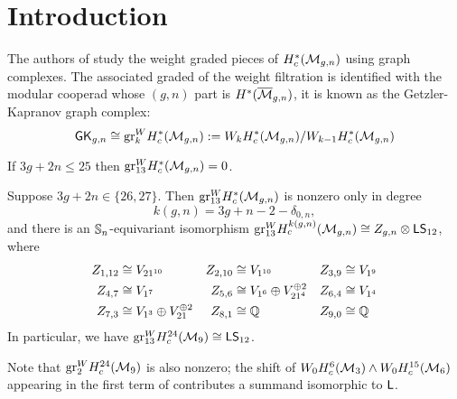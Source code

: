 



\section{Introduction}

The authors of \cite{CLPW2} study the weight graded pieces of $H^*_c(\M_{g,n})$ using graph complexes. The associated graded of the weight filtration is identified with the modular cooperad whose $(g,n)$ part is $H^*(\Mb_{g,n})$, it is known as the Getzler-Kapranov graph complex:
\begin{equation}
    \GK_{g,n} \cong  \gr^W_k H^*_c(\M_{g,n}) := W_k H^*_c(\M_{g,n})/W_{k-1}H^*_c(\M_{g,n})
\end{equation}


\begin{prop}\label{prop:wt 13 vanishing}
    If $3g + 2n \leq 25$ then $\gr_{13}^W H^*_c(\M_{g,n}) = 0$.
\end{prop}

\begin{thm} \label{thm:lowexc13}
    Suppose $3g + 2n \in \{26, 27\}$. Then $\gr_{13}^W H^*_c(\M_{g,n})$ is nonzero only in degree $$k(g,n) = 3g + n - 2 - \delta_{0,n},$$ and there is an $\ss_n$-equivariant isomorphism $\gr_{13}^W H^{k(g,n)}_c(\cM_{g,n}) \cong Z_{g,n} \otimes \lstw$, where
\begin{align*}
    Z_{1,12} & \cong V_{21^{10}} & Z_{2,10} & \cong V_{1^{10}} & Z_{3,9} & \cong V_{1^{9}} \\
    Z_{4,7} & \cong V_{1^{7}} & Z_{5,6} & \cong V_{1^{6}} \oplus V_{21^4}^{\oplus 2} & Z_{6,4} & \cong V_{1^{4}} \\ Z_{7,3} & \cong V_{1^{3}} \oplus V_{21}^{\oplus 2}& Z_{8,1} & \cong \Q & Z_{9,0} & \cong \Q 
\end{align*}
In particular, we have $\gr_{13}^W H^{24}_c(\M_9) \cong \lstw$.
\end{thm}

\noindent  Note that  $\gr_2^W H^{24}_c(\M_9)$ is also nonzero; the shift of $W_0H^6_c(\M_3) \wedge W_0H^{15}_c(\M_6)$ appearing in the first term of  \cite[Theorem~1.2]{PayneWillwacher21} contributes a summand isomorphic to $\l$. 